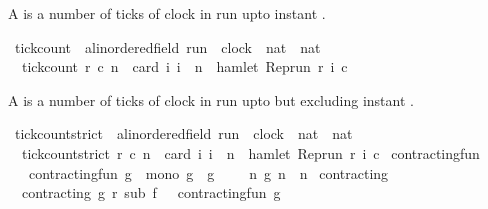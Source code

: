 \begin{isabellebody}
\begin{isamarkuptext}%
A  is a
  number of ticks of clock  in run  upto instant .%
\end{isamarkuptext}\isamarkuptrue%
\isamarkupfalse%
\ tick{\isacharunderscore}count\ {\isacharcolon}{\isacharcolon}\ {\isacartoucheopen}{\isacharprime}a{\isacharcolon}{\isacharcolon}linordered{\isacharunderscore}field\ run\ {\isasymRightarrow}\ clock\ {\isasymRightarrow}\ nat\ {\isasymRightarrow}\ nat{\isacartoucheclose}\isanewline
{}\isanewline
\ \ {\isacartoucheopen}tick{\isacharunderscore}count\ r\ c\ n\ {\isacharequal}\ card\ {\isacharbraceleft}i{\isachardot}\ i\ {\isasymle}\ n\ {\isasymand}\ hamlet\ {\isacharparenleft}{\isacharparenleft}Rep{\isacharunderscore}run\ r{\isacharparenright}\ i\ c{\isacharparenright}{\isacharbraceright}{\isacartoucheclose}%
\begin{isamarkuptext}%
A  is a number of ticks of clock  in run 
       upto but  excluding instant .%
\end{isamarkuptext}\isamarkuptrue%
\isamarkupfalse%
\ tick{\isacharunderscore}count{\isacharunderscore}strict\ {\isacharcolon}{\isacharcolon}\ {\isacartoucheopen}{\isacharprime}a{\isacharcolon}{\isacharcolon}linordered{\isacharunderscore}field\ run\ {\isasymRightarrow}\ clock\ {\isasymRightarrow}\ nat\ {\isasymRightarrow}\ nat{\isacartoucheclose}\isanewline
{}\isanewline
\ \ {\isacartoucheopen}tick{\isacharunderscore}count{\isacharunderscore}strict\ r\ c\ n\ {\isacharequal}\ card\ {\isacharbraceleft}i{\isachardot}\ i\ {\isacharless}\ n\ {\isasymand}\ hamlet\ {\isacharparenleft}{\isacharparenleft}Rep{\isacharunderscore}run\ r{\isacharparenright}\ i\ c{\isacharparenright}{\isacharbraceright}{\isacartoucheclose}\isanewline
\isanewline
{}\isamarkupfalse%
\ contracting{\isacharunderscore}fun\isanewline
\ \ \ {\isacartoucheopen}contracting{\isacharunderscore}fun\ g\ {\isasymequiv}\ mono\ g\ {\isasymand}\ g\ {}\ {\isacharequal}\ {}\ {\isasymand}\ {\isacharparenleft}{\isasymforall}n{\isachardot}\ g\ n\ {\isasymle}\ n{\isacharparenright}{\isacartoucheclose}\isanewline
\isanewline
{}\isamarkupfalse%
\ contracting\isanewline
{}\ \isanewline
\ \ {\isacartoucheopen}contracting\ g\ r\ sub\ f\ {\isasymequiv}\ \ contracting{\isacharunderscore}fun\ g\isanewline

\end{isabellebody}
